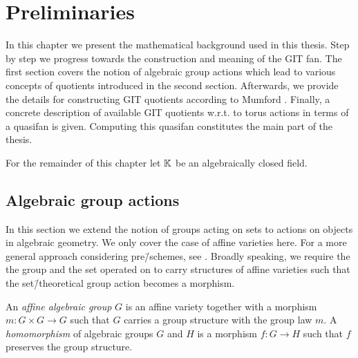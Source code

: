 \chapter{Preliminaries}

In this chapter we present the mathematical background used in this thesis. Step by step we progress towards the construction and meaning of the GIT fan. The first section covers the notion of algebraic group actions which lead to various concepts of quotients introduced in the second section. Afterwards, we provide the details for constructing GIT quotients according to Mumford \cite{git}. Finally, a concrete description of available GIT quotients w.r.t. to torus actions in terms of a quasifan is given. Computing this quasifan constitutes the main part of the thesis.

For the remainder of this chapter let $\mathbb{K}$ be an algebraically closed field.


\section{Algebraic group actions}

In this section we extend the notion of groups acting on sets to actions on objects in algebraic geometry. We only cover the case of affine varieties here. For a more general approach considering pre\=/schemes, see \cite{git}. Broadly speaking, we require the the group and the set operated on to carry structures of affine varieties such that the set\=/theoretical group action becomes a morphism.

\begin{defi}
	An \emph{affine algebraic group} $G$ is an affine variety together with a morphism $m\colon G \times G \rightarrow G$ such that $G$ carries a group structure with the group law $m$. A \emph{homomorphism} of algebraic groups $G$ and $H$ is a morphism $f\colon G \rightarrow H$ such that $f$ preserves the group structure.
\end{defi}


